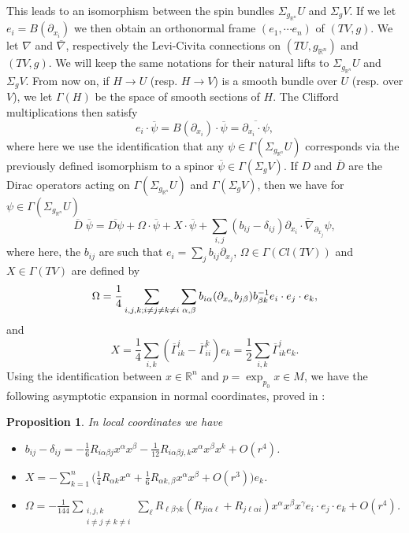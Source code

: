 \documentclass[11pt]{article}
\newtheorem{proposition}{Proposition}[section]
\def \R {\mathbb{R}}
\begin{document}
{\begin{center}
\begin{tikzpicture}[x=0.75pt,y=0.75pt,yscale=-1,xscale=1]
\end{tikzpicture}
\end{center}

\noindent
This leads to an isomorphism between the spin bundles $\Sigma_{g_{\R^{n}}} U$ and $\Sigma_{g} V$. If we let $e_{i}=B(\partial_{x_{i}})$ we then obtain an orthonormal frame $(e_{1},\cdots e_{n})$ of $(TV,g)$. We let $\nabla$ and $\overline{\nabla}$, respectively the Levi-Civita connections on $(TU,g_{\R^{n}})$ and $(TV,g)$. We will keep the same notations for their natural lifts to $\Sigma_{g_{\R^{n}}} U$ and $\Sigma_{g} V$. From now on, if $H\to U$ (resp. $H\to V$) is a smooth bundle over $U$ (resp. over $V$), we let $\Gamma(H)$ be the space of smooth sections of $H$. The Clifford multiplications then satisfy
$$e_{i}\cdot \overline{\psi}=B(\partial_{x_{i}})\cdot \overline{\psi}=\overline{\partial_{x_{i}}\cdot \psi},$$
where here we use the identification that any $\psi \in \Gamma (\Sigma_{g_{\R^{n}}} U)$ corresponds via the previously defined isomorphism to a spinor $\overline{\psi}\in \Gamma(\Sigma_{g} V)$. If $D$ and $\overline{D}$ are the Dirac operators acting on $\Gamma (\Sigma_{g_{\R^{n}}} U)$ and $\Gamma (\Sigma_{g} V)$, then we have for $\psi \in \Gamma(\Sigma_{g_{\R^{n}}} U)$ 
$$\overline{D} \; \overline{\psi}=\overline{D\psi} +\Omega\cdot \overline{\psi}+X\cdot \overline{\psi}+\sum_{i,j}(b_{ij}-\delta_{ij})\overline{\partial_{x_{i}}\cdot \nabla_{\partial_{x_{j}}}\psi},$$
where here, the $b_{ij}$ are such that $e_{i}=\sum_{j} b_{ij}\partial_{x_{j}}$, $\Omega\in \Gamma(Cl(TV))$ and $X\in \Gamma(TV)$ are defined by
$$\Omega=\frac{1}{4} \sum_{i,j,k;\\ i\not=j\not=k\not=i} \sum_{\alpha,\beta} b_{i\alpha}(\partial_{x_{\alpha}}b_{j\beta})b^{-1}_{\beta k}e_{i}\cdot e_{j}\cdot e_{k},$$
and
$$X=\frac{1}{4}\sum_{i,k}(\overline{\Gamma}_{ik}^{i}-\overline{\Gamma}_{ii}^{k})e_{k}=\frac{1}{2}\sum_{i,k}\overline{\Gamma}_{ik}^{i}e_{k}.$$
Using the identification between $x\in \R^{n}$ and $p=\exp_{p_{0}}x\in M$, we have the following asymptotic expansion in normal coordinates, proved in \cite{YX1}:

\begin{proposition}\label{propest1}
In local coordinates we have
\begin{itemize}
\item[i)] $b_{ij}-\delta_{ij}=-\frac{1}{6}R_{i\alpha\beta j}x^{\alpha}x^{\beta}-\frac{1}{12}R_{i\alpha\beta j,k}x^{\alpha}x^{\beta}x^{k}+O(r^{4})$.
\item[ii)] $X=-\sum\limits_{k=1}^{n}\Big(\frac{1}{4}R_{\alpha k}x^{\alpha}+\frac{1}{6}R_{\alpha k,\beta}x^{\alpha}x^{\beta}+O(r^{3})\Big)e_{k}$.
\item[iii)] $\Omega=-\frac{1}{144}\sum\limits_{\begin{array}{cc}
i,j,k\\
 i\not=j\not=k\not=i
\end{array}}\sum\limits_{\ell}R_{\ell \beta \gamma k}(R_{ji\alpha\ell}+R_{j\ell\alpha i})x^{\alpha}x^{\beta}x^{\gamma}e_{i}\cdot e_{j}\cdot e_{k}+O(r^{4})$.
\end{itemize}
\end{proposition}


}
\end{document}
